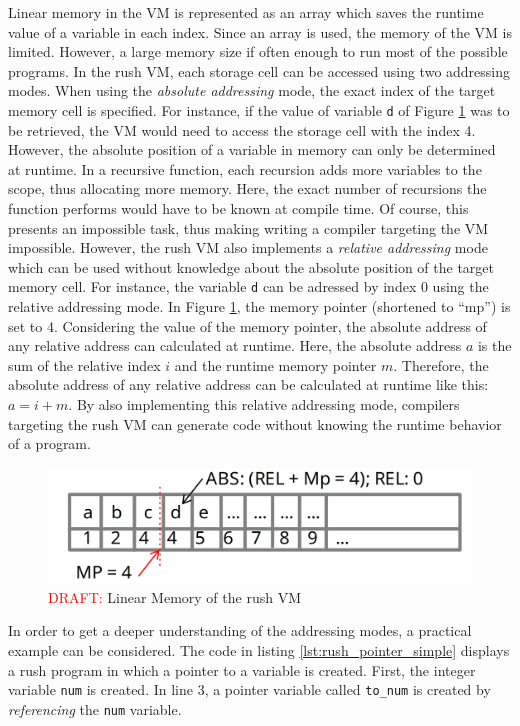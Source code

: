 Linear memory in the VM is represented as an array which saves the runtime value of a variable in each index.
Since an array is used, the memory of the VM is limited.
However, a large memory size if often enough to run most of the possible programs.
In the rush VM, each storage cell can be accessed using two addressing modes.
When using the \emph{absolute addressing} mode, the exact index of the target memory cell is specified.
For instance, if the value of variable \texttt{d} of Figure \ref{fig:rush_vm_linmem} was to be retrieved, the VM would need to access the storage cell with the index 4.
However, the absolute position of a variable in memory can only be determined at runtime.
In a recursive function, each recursion adds more variables to the scope, thus allocating more memory.
Here, the exact number of recursions the function performs would have to be known at compile time.
Of course, this presents an impossible task, thus making writing a compiler targeting the VM impossible.
However, the rush VM also implements a \emph{relative addressing} mode which can be used without knowledge about the absolute position of the target memory cell.
For instance, the variable \texttt{d} can be adressed by index 0 using the relative addressing mode.
In Figure \ref{fig:rush_vm_linmem}, the memory pointer (shortened to \enquote{mp}) is set to 4.
Considering the value of the memory pointer, the absolute address of any relative address can calculated at runtime.
Here, the absolute address $a$ is the sum of the relative index $i$ and the runtime memory pointer $m$.
Therefore, the absolute address of any relative address can be calculated at runtime like this: $a = i + m$.
By also implementing this relative addressing mode,
compilers targeting the rush VM can generate code without knowing the runtime behavior of a program.

\begin{figure}[h]
	\includegraphics[width=\textwidth]{./vm_linmem_draft.png}
	\caption{\textcolor{red}{DRAFT:} Linear Memory of the rush VM}
	\label{fig:rush_vm_linmem}
\end{figure}

In order to get a deeper understanding of the addressing modes, a practical example can be considered.
The code in listing \ref{lst:rush_pointer_simple} displays a rush program in which a pointer to a variable is created.
First, the integer variable \texttt{num} is created.
In line 3, a pointer variable called \texttt{to\_num} is created by \emph{referencing} the \texttt{num} variable.

